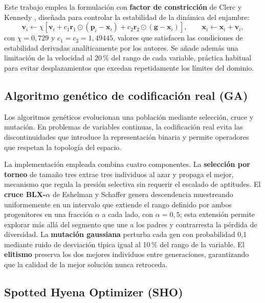Este trabajo emplea la formulación con \textbf{factor de constricción} de Clerc y Kennedy \cite{Clerc2002Constriction}, diseñada para controlar la estabilidad de la dinámica del enjambre:
\begin{equation}
\mathbf{v}_i \leftarrow \chi \left[ \mathbf{v}_i + c_1 \mathbf{r}_1 \odot (\mathbf{p}_i - \mathbf{x}_i) + c_2 \mathbf{r}_2 \odot (\mathbf{g} - \mathbf{x}_i) \right], \qquad
\mathbf{x}_i \leftarrow \mathbf{x}_i + \mathbf{v}_i,
\end{equation}
con $\chi = 0{,}729$ y $c_1 = c_2 = 1{,}49445$, valores que satisfacen las condiciones de estabilidad derivadas analíticamente por los autores. Se añade además una limitación de la velocidad al 20\,\% del rango de cada variable, práctica habitual para evitar desplazamientos que excedan repetidamente los límites del dominio.

\subsection{Algoritmo genético de codificación real (GA)}

Los algoritmos genéticos \cite{Goldberg1989GA} evolucionan una población mediante selección, cruce y mutación. En problemas de variables continuas, la codificación real evita las discontinuidades que introduce la representación binaria y permite operadores que respetan la topología del espacio.

La implementación empleada combina cuatro componentes. La \textbf{selección por torneo} de tamaño tres extrae tres individuos al azar y propaga el mejor, mecanismo que regula la presión selectiva sin requerir el escalado de aptitudes. El \textbf{cruce BLX-}$\alpha$ de Eshelman y Schaffer \cite{Eshelman1993BLX} genera descendencia muestreando uniformemente en un intervalo que extiende el rango definido por ambos progenitores en una fracción $\alpha$ a cada lado, con $\alpha = 0{,}5$; esta extensión permite explorar más allá del segmento que une a los padres y contrarresta la pérdida de diversidad. La \textbf{mutación gaussiana} perturba cada gen con probabilidad 0,1 mediante ruido de desviación típica igual al 10\,\% del rango de la variable. El \textbf{elitismo} preserva los dos mejores individuos entre generaciones, garantizando que la calidad de la mejor solución nunca retroceda.

\subsection{Spotted Hyena Optimizer (SHO)}

